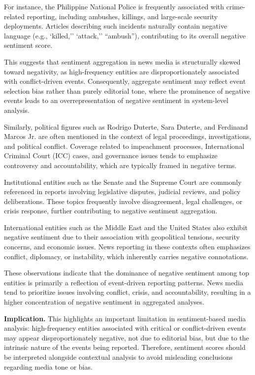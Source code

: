 \documentclass[sigconf, nonacm]{acmart}
\begin{document}
For instance, the Philippine National Police is frequently associated with crime-related reporting, including ambushes, killings, and large-scale security deployments. Articles describing such incidents naturally contain negative language (e.g., `killed,'' `attack,'' ``ambush''), contributing to its overall negative sentiment score.

This suggests that sentiment aggregation in news media is structurally skewed toward negativity, as high-frequency entities are disproportionately associated with conflict-driven events. Consequently, aggregate sentiment may reflect event selection bias rather than purely editorial tone, where the prominence of negative events leads to an overrepresentation of negative sentiment in system-level analysis.


Similarly, political figures such as Rodrigo Duterte, Sara Duterte, and Ferdinand Marcos Jr. are often mentioned in the context of legal proceedings, investigations, and political conflict. Coverage related to impeachment processes, International Criminal Court (ICC) cases, and governance issues tends to emphasize controversy and accountability, which are typically framed in negative terms.

Institutional entities such as the Senate and the Supreme Court are commonly referenced in reports involving legislative disputes, judicial reviews, and policy deliberations. These topics frequently involve disagreement, legal challenges, or crisis response, further contributing to negative sentiment aggregation.

International entities such as the Middle East and the United States also exhibit negative sentiment due to their association with geopolitical tensions, security concerns, and economic issues. News reporting in these contexts often emphasizes conflict, diplomacy, or instability, which inherently carries negative connotations.

These observations indicate that the dominance of negative sentiment among top entities is primarily a reflection of event-driven reporting patterns. News media tend to prioritize issues involving conflict, crisis, and accountability, resulting in a higher concentration of negative sentiment in aggregated analyses.

\textbf{Implication.}
This highlights an important limitation in sentiment-based media analysis: high-frequency entities associated with critical or conflict-driven events may appear disproportionately negative, not due to editorial bias, but due to the intrinsic nature of the events being reported. Therefore, sentiment scores should be interpreted alongside contextual analysis to avoid misleading conclusions regarding media tone or bias.
\end{document}
